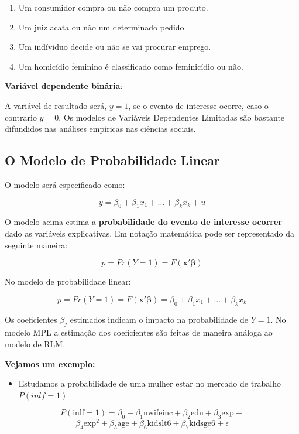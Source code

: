 \documentclass[
  letterpaper,
  DIV=11,
  numbers=noendperiod]{scrreprt}
\providecommand{\tightlist}{%
  \setlength{\itemsep}{0pt}\setlength{\parskip}{0pt}}
\begin{document}
\begin{enumerate}
\def\labelenumi{\arabic{enumi})}
\tightlist
\item
  Um consumidor compra ou não compra um produto.
\item
  Um juiz acata ou não um determinado pedido.
\item
  Um indíviduo decide ou não se vai procurar emprego.
\item
  Um homicídio feminino é classificado como feminicídio ou não.
\end{enumerate}

\textbf{Variável dependente binária}:

A variável de resultado será, \(y = 1\), se o evento de interesse
ocorre, caso o contrario \(y=0\). Os modelos de Variáveis Dependentes
Limitadas são bastante difundidos nas análises empíricas nas ciências
sociais.

\subsection{O Modelo de Probabilidade
Linear}\label{o-modelo-de-probabilidade-linear}

O modelo será especificado como:

\[y= \beta_0 + \beta_1 x_1 + ... +\beta_kx_k +u\]

O modelo acima estima a \textbf{probabilidade do evento de interesse
ocorrer} dado as variáveis explicativas. Em notação matemática pode ser
representado da seguinte maneira:

\[p=Pr(Y=1)=F(\mathbf{x}'\boldsymbol{\beta})\]

No modelo de probabilidade linear:

\[p=Pr(Y=1)=F(\mathbf{x}'\boldsymbol{\beta})= \beta_0 + \beta_1 x_1 + ... +\beta_kx_k \]

Os coeficientes \(\beta_j\) estimados indicam o impacto na probabilidade
de \(Y=1\). No modelo MPL a estimação dos coeficientes são feitas de
maneira análoga ao modelo de RLM.

\textbf{Vejamos um exemplo:}

\begin{itemize}
\tightlist
\item
  Estudamos a probabilidade de uma mulher estar no mercado de trabalho
  \(P(inlf=1)\)
\end{itemize}

\[P(\text{inlf}=1)= \beta_0 + \beta_1 \text{nwifeinc} + \beta_2 \text{edu} +\beta_3 \text{exp}+\]
\[\beta_4 \text{exp}^2+\beta_5 \text{age}+\beta_6 \text{kidslt6}+\beta_7 \text{kidsge6} +\epsilon\]
\end{document}
